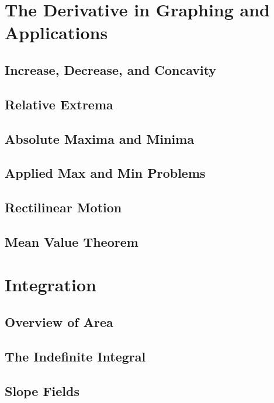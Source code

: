 \documentclass[letterpaper]{report}
\theoremstyle{definition}
\begin{document}
\chapter{The Derivative in Graphing and Applications}

\section{Increase, Decrease, and Concavity}

\section{Relative Extrema}

\section{Absolute Maxima and Minima}

\section{Applied Max and Min Problems}

\section{Rectilinear Motion}

\section{Mean Value Theorem}


\chapter{Integration}

\section{Overview of Area}

\section{The Indefinite Integral}

\section{Slope Fields}
\end{document}
